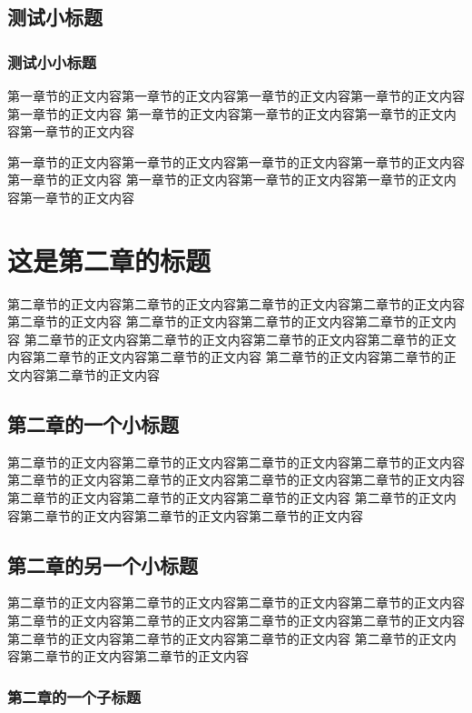 \documentclass{yacaugrad}
\begin{document}
\subsection{测试小标题}
\subsubsection{测试小小标题}

第一章节的正文内容第一章节的正文内容第一章节的正文内容第一章节的正文内容第一章节的正文内容
第一章节的正文内容第一章节的正文内容第一章节的正文内容第一章节的正文内容

第一章节的正文内容第一章节的正文内容第一章节的正文内容第一章节的正文内容第一章节的正文内容
第一章节的正文内容第一章节的正文内容第一章节的正文内容第一章节的正文内容

\section{这是第二章的标题}

第二章节的正文内容第二章节的正文内容第二章节的正文内容第二章节的正文内容第二章节的正文内容
第二章节的正文内容第二章节的正文内容第二章节的正文内容
第二章节的正文内容第二章节的正文内容第二章节的正文内容第二章节的正文内容第二章节的正文内容第二章节的正文内容
第二章节的正文内容第二章节的正文内容第二章节的正文内容

\subsection{第二章的一个小标题}

第二章节的正文内容第二章节的正文内容第二章节的正文内容第二章节的正文内容
第二章节的正文内容第二章节的正文内容第二章节的正文内容第二章节的正文内容第二章节的正文内容第二章节的正文内容第二章节的正文内容
第二章节的正文内容第二章节的正文内容第二章节的正文内容第二章节的正文内容

\subsection{第二章的另一个小标题}

第二章节的正文内容第二章节的正文内容第二章节的正文内容\cite{汪昂1881}第二章节的正文内容
第二章节的正文内容第二章节的正文内容第二章节的正文内容第二章节的正文内容第二章节的正文内容第二章节的正文内容第二章节的正文内容
第二章节的正文内容第二章节的正文内容第二章节的正文内容

\subsubsection{第二章的一个子标题}
\end{document}
